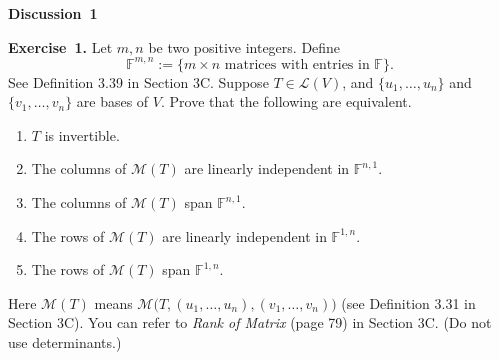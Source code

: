 \documentclass[11pt]{article}
\newcommand{\AssignmentType}{Discussion} %
\newcommand{\AssignmentNumber}{1}
\newcommand{\ProblemDivider}[1]{%
  \vspace{1.0em}
  \noindent\textbf{#1}\par
  \vspace{0.35em}
}
\newcommand{\ProblemAnnounce}{\noindent}
\newcommand{\Exercise}[1]{\textbf{Exercise~#1.}\;}
\begin{document}
\begin{center}
  {\Large \textbf{\AssignmentType~\AssignmentNumber}}
\end{center}
\vspace{0.75em}

\ProblemDivider{}

\begin{problemBox}
\ProblemAnnounce
\Exercise{1}
Let $m,n$ be two positive integers. Define
\[
\mathbb{F}^{m,n}:=\{\text{$m\times n$ matrices with entries in $\mathbb{F}$}\}.
\]
See Definition 3.39 in Section 3C. Suppose $T\in \mathcal{L}(V)$, and $\{u_1,\dots,u_n\}$ and $\{v_1,\dots,v_n\}$ are bases of $V$.
Prove that the following are equivalent.
\begin{enumerate}
  \item[(a)] $T$ is invertible.
  \item[(b)] The columns of $\mathcal{M}(T)$ are linearly independent in $\mathbb{F}^{n,1}$.
  \item[(c)] The columns of $\mathcal{M}(T)$ span $\mathbb{F}^{n,1}$.
  \item[(d)] The rows of $\mathcal{M}(T)$ are linearly independent in $\mathbb{F}^{1,n}$.
  \item[(e)] The rows of $\mathcal{M}(T)$ span $\mathbb{F}^{1,n}$.
\end{enumerate}
Here $\mathcal{M}(T)$ means $\mathcal{M}\!\bigl(T,(u_1,\dots,u_n),(v_1,\dots,v_n)\bigr)$ (see Definition 3.31 in Section 3C).
You can refer to \emph{Rank of Matrix} (page 79) in Section 3C. (Do not use determinants.)
\end{problemBox}
\end{document}
